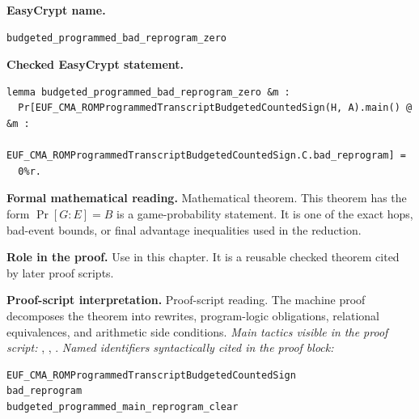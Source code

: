 \begin{formaltheorem}
\noindent\textbf{EasyCrypt name.}
\begin{lstlisting}[language=EasyCrypt,basicstyle=\ttfamily\scriptsize]
budgeted_programmed_bad_reprogram_zero
\end{lstlisting}
\noindent\textbf{Checked EasyCrypt statement.}
\begin{lstlisting}[language=EasyCrypt,basicstyle=\ttfamily\scriptsize]
lemma budgeted_programmed_bad_reprogram_zero &m :
  Pr[EUF_CMA_ROMProgrammedTranscriptBudgetedCountedSign(H, A).main() @ &m :
    EUF_CMA_ROMProgrammedTranscriptBudgetedCountedSign.C.bad_reprogram] =
  0%r.
\end{lstlisting}
\noindent\textbf{Formal mathematical reading.}
Mathematical theorem. This theorem has the form \(\Pr[G:E] = B\) is a game-probability statement.  It is one of the exact hops, bad-event bounds, or final advantage inequalities used in the reduction.

\noindent\textbf{Role in the proof.}
Use in this chapter. It is a reusable checked theorem cited by later proof scripts.

\noindent\textbf{Proof-script interpretation.}
Proof-script reading. The machine proof decomposes the theorem into rewrites, program-logic obligations, relational equivalences, and arithmetic side conditions.
\emph{Main tactics visible in the proof script:} , , .
\emph{Named identifiers syntactically cited in the proof block:}
\begin{lstlisting}[language=EasyCrypt,basicstyle=\ttfamily\scriptsize]
EUF_CMA_ROMProgrammedTranscriptBudgetedCountedSign
bad_reprogram
budgeted_programmed_main_reprogram_clear
\end{lstlisting}

\end{formaltheorem}

